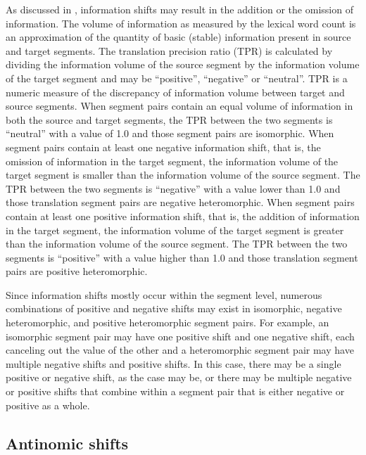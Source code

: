 \documentclass[output=paper]{langsci/langscibook}
\begin{document}
As discussed in , information shifts may result in the addition or the omission of information. The volume of information as measured by the lexical word count is an approximation of the quantity of basic (stable) information present in source and target segments. The translation precision ratio (TPR) is calculated by dividing the information volume of the source segment by the information volume of the target segment and may be \enquote{positive}, \enquote{negative} or \enquote{neutral}. TPR is a numeric measure of the discrepancy of information volume between target and source segments. When segment pairs contain an equal volume of information in both the source and target segments, the TPR between the two segments is \enquote{neutral} with a value of 1.0 and those segment pairs are isomorphic. When segment pairs contain at least one negative information shift, that is, the omission of information in the target segment, the information volume of the target segment is smaller than the information volume of the source segment. The TPR between the two segments is \enquote{negative} with a value lower than 1.0 and those translation segment pairs are negative heteromorphic. When segment pairs contain at least one positive information shift, that is, the addition of information in the target segment, the information volume of the target segment is greater than the information volume of the source segment. The TPR between the two segments is \enquote{positive} with a value higher than 1.0 and those translation segment pairs are positive heteromorphic.

Since information shifts mostly occur within the segment level, numerous combinations of positive and negative shifts may exist in isomorphic, negative heteromorphic, and positive heteromorphic segment pairs. For example, an isomorphic segment pair may have one positive shift and one negative shift, each canceling out the value of the other and a heteromorphic segment pair may have multiple negative shifts and positive shifts. In this case, there may be a single positive or negative shift, as the case may be, or there may be multiple negative or positive shifts that combine within a segment pair that is either negative or positive as a whole.

\subsection{Antinomic shifts}
\end{document}
